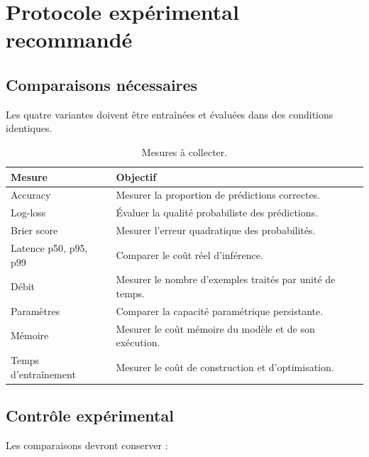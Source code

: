 \documentclass[11pt,a4paper]{article}
\begin{document}
\section{Protocole expérimental recommandé}

\subsection{Comparaisons nécessaires}

Les quatre variantes doivent être entraînées et évaluées
dans des conditions identiques.

\begin{table}[H]
\centering
\small
\begin{tabularx}{\textwidth}{
  >{\raggedright\arraybackslash}p{3.0cm}
  X
}
\toprule
Mesure & Objectif\\
\midrule
Accuracy
&
Mesurer la proportion de prédictions correctes.\\

Log-loss
&
Évaluer la qualité probabiliste des prédictions.\\

Brier score
&
Mesurer l'erreur quadratique des probabilités.\\

Latence p50, p95, p99
&
Comparer le coût réel d'inférence.\\

Débit
&
Mesurer le nombre d'exemples traités par unité de temps.\\

Paramètres
&
Comparer la capacité paramétrique persistante.\\

Mémoire
&
Mesurer le coût mémoire du modèle et de son exécution.\\

Temps d'entraînement
&
Mesurer le coût de construction et d'optimisation.\\
\bottomrule
\end{tabularx}
\caption{Mesures à collecter.}
\end{table}

\subsection{Contrôle expérimental}

Les comparaisons devront conserver :
\end{document}
